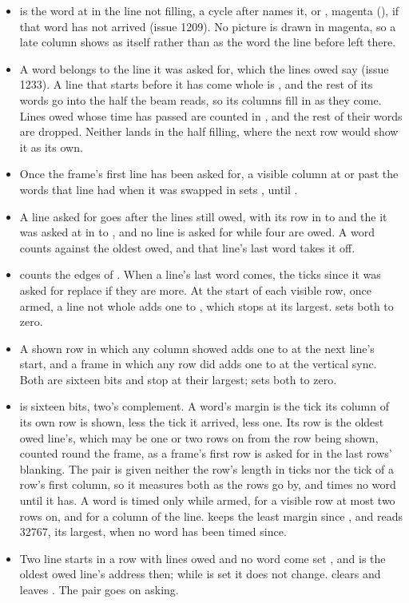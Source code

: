 \begin{itemize}
With  low the pair disarms: it asks for nothing more, and
does not set . Shown again, it starts from the base's
line as out of a reset.
\item {} is the word at  in the line not filling, a
cycle after  names it, or , magenta
(), if that word has not arrived (issue 1209). No
picture is drawn in magenta, so a late column shows as itself rather
than as the word the line before left there.
\item A word belongs to the line it was asked for, which the lines owed
say (issue 1233). A line that starts before it has come whole is
, and the rest of its words go into the half the beam
reads, so its columns fill in as they come. Lines owed whose time has
passed are counted in , and the rest of their words are
dropped. Neither lands in the half filling, where the next row would
show it as its own.
\item Once the frame's first line has been asked for, a visible column
at or past the words that line had when it was swapped in sets
, until .
\item A line asked for goes after the lines still owed, with its row
in  to  and the  it was asked at in
 to , and no line is asked for while four are owed.
A word counts against the oldest owed, and that line's last word takes
it off.
\item {} counts the edges of . When a line's last word
comes, the ticks since it was asked for replace  if they
are more. At the start of each visible row, once armed, a line not
whole adds one to , which stops at its largest.
 sets both to zero.
\item A shown row in which any column showed  adds one to
 at the next line's start, and a frame in which any
row did adds one to  at the vertical sync. Both are
sixteen bits and stop at their largest;  sets both to
zero.
\item {} is sixteen bits, two's complement. A word's margin
is the tick its column of its own row is shown, less the tick it
arrived, less one. Its row is the oldest owed line's, which may be one
or two rows on from the row being shown, counted round the frame, as
a frame's first row is asked for in the last rows' blanking. The pair
is given neither the row's length in ticks nor the tick of a row's
first column, so it measures both as the rows go by, and times no
word until it has. A word is timed only while armed, for a visible
row at most two rows on, and for a column of the line.
 keeps the least margin since , and reads
32767, its largest, when no word has been timed since.
\item Two line starts in a row with lines owed and no word come set
, and  is the oldest owed line's address
then; while  is set it does not change. 
clears  and leaves . The pair goes on
asking.
\end{itemize}


